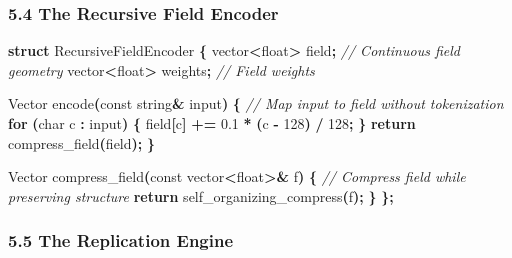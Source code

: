 \documentclass[
  11pt,
  a4paper,
]{article}
\newenvironment{Shaded}{\begin{snugshade}}{\end{snugshade}}
\newcommand{\AttributeTok}[1]{\textcolor[rgb]{0.13,0.29,0.53}{#1}}
\newcommand{\CommentTok}[1]{\textcolor[rgb]{0.56,0.35,0.01}{\textit{#1}}}
\newcommand{\ControlFlowTok}[1]{\textcolor[rgb]{0.13,0.29,0.53}{\textbf{#1}}}
\newcommand{\DataTypeTok}[1]{\textcolor[rgb]{0.13,0.29,0.53}{#1}}
\newcommand{\DecValTok}[1]{\textcolor[rgb]{0.00,0.00,0.81}{#1}}
\newcommand{\FloatTok}[1]{\textcolor[rgb]{0.00,0.00,0.81}{#1}}
\newcommand{\KeywordTok}[1]{\textcolor[rgb]{0.13,0.29,0.53}{\textbf{#1}}}
\newcommand{\NormalTok}[1]{#1}
\newcommand{\OperatorTok}[1]{\textcolor[rgb]{0.81,0.36,0.00}{\textbf{#1}}}
\begin{document}
\subsubsection{5.4 The Recursive Field
Encoder}\label{the-recursive-field-encoder}

\begin{Shaded}
\begin{Highlighting}[]
\KeywordTok{struct}\NormalTok{ RecursiveFieldEncoder }\OperatorTok{\{}
\NormalTok{    vector}\OperatorTok{\textless{}}\DataTypeTok{float}\OperatorTok{\textgreater{}}\NormalTok{ field}\OperatorTok{;}      \CommentTok{// Continuous field geometry}
\NormalTok{    vector}\OperatorTok{\textless{}}\DataTypeTok{float}\OperatorTok{\textgreater{}}\NormalTok{ weights}\OperatorTok{;}    \CommentTok{// Field weights}
    
\NormalTok{    Vector encode}\OperatorTok{(}\AttributeTok{const}\NormalTok{ string}\OperatorTok{\&}\NormalTok{ input}\OperatorTok{)} \OperatorTok{\{}
        \CommentTok{// Map input to field without tokenization}
        \ControlFlowTok{for} \OperatorTok{(}\DataTypeTok{char}\NormalTok{ c }\OperatorTok{:}\NormalTok{ input}\OperatorTok{)} \OperatorTok{\{}
\NormalTok{            field}\OperatorTok{[}\NormalTok{c}\OperatorTok{]} \OperatorTok{+=} \FloatTok{0.1} \OperatorTok{*} \OperatorTok{(}\NormalTok{c }\OperatorTok{{-}} \DecValTok{128}\OperatorTok{)} \OperatorTok{/} \DecValTok{128}\OperatorTok{;}
        \OperatorTok{\}}
        \ControlFlowTok{return}\NormalTok{ compress\_field}\OperatorTok{(}\NormalTok{field}\OperatorTok{);}
    \OperatorTok{\}}
    
\NormalTok{    Vector compress\_field}\OperatorTok{(}\AttributeTok{const}\NormalTok{ vector}\OperatorTok{\textless{}}\DataTypeTok{float}\OperatorTok{\textgreater{}\&}\NormalTok{ f}\OperatorTok{)} \OperatorTok{\{}
        \CommentTok{// Compress field while preserving structure}
        \ControlFlowTok{return}\NormalTok{ self\_organizing\_compress}\OperatorTok{(}\NormalTok{f}\OperatorTok{);}
    \OperatorTok{\}}
\OperatorTok{\};}
\end{Highlighting}
\end{Shaded}

\subsubsection{5.5 The Replication Engine}\label{the-replication-engine}
\end{document}
